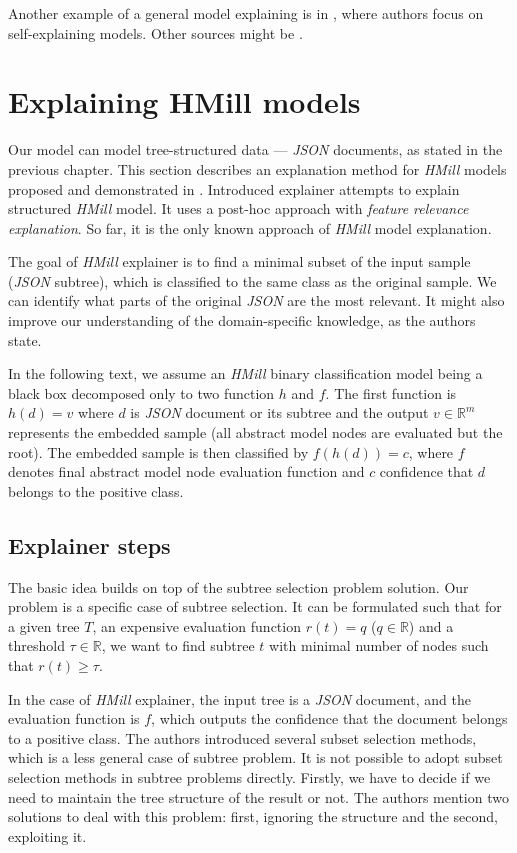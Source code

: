Another example of a general model explaining is in \cite{Alvarez-Melis2018}, where authors focus on self-explaining models. Other sources might be \cite{Strumbelj2013,Robnik-Sikonja2008,Montavon2018}.

\section{Explaining HMill models}
Our model can model tree-structured data --- \emph{JSON} documents, as stated in the previous chapter. This section describes an explanation method for \emph{HMill} models proposed and demonstrated in \cite{Pevny2020}. Introduced explainer attempts to explain structured \emph{HMill} model. It uses a post-hoc approach with \emph{feature relevance explanation}. So far, it is the only known approach of \emph{HMill} model explanation.

The goal of \emph{HMill} explainer is to find a minimal subset of the input sample (\emph{JSON} subtree), which is classified to the same class as the original sample. We can identify what parts of the original \emph{JSON} are the most relevant. It might also improve our understanding of the domain-specific knowledge, as the authors state.

In the following text, we assume an \emph{HMill} binary classification model being a black box decomposed only to two function $h$ and $f$. The first function is $h(d)=v$ where $d$ is \emph{JSON} document or its subtree and the output $v\in\mathbb{R}^{m}$ represents the embedded sample (all abstract model nodes are evaluated but the root). The embedded sample is then classified by $f(h(d))=c$, where $f$ denotes final abstract model node evaluation function and $c$ confidence that $d$ belongs to the positive class.

\subsection{Explainer steps}
The basic idea builds on top of the subtree selection problem solution. Our problem is a specific case of subtree selection. It can be formulated such that for a given tree $T$, an expensive evaluation function $r(t)=q$ ($q\in\mathbb{R}$) and a threshold $\tau\in\mathbb{R}$, we want to find subtree $t$ with minimal number of nodes such that $r(t)\geq\tau$. 

In the case of \emph{HMill} explainer, the input tree is a \emph{JSON} document, and the evaluation function is $f$, which outputs the confidence that the document belongs to a positive class. The authors introduced several subset selection methods, which is a less general case of subtree problem. It is not possible to adopt subset selection methods in subtree problems directly. Firstly, we have to decide if we need to maintain the tree structure of the result or not. The authors mention two solutions to deal with this problem: first, ignoring the structure and the second, exploiting it.

